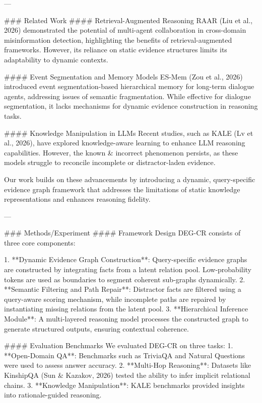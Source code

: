 ---

### Related Work
#### Retrieval-Augmented Reasoning
RAAR (Liu et al., 2026) demonstrated the potential of multi-agent collaboration in cross-domain misinformation detection, highlighting the benefits of retrieval-augmented frameworks. However, its reliance on static evidence structures limits its adaptability to dynamic contexts.

#### Event Segmentation and Memory Models
ES-Mem (Zou et al., 2026) introduced event segmentation-based hierarchical memory for long-term dialogue agents, addressing issues of semantic fragmentation. While effective for dialogue segmentation, it lacks mechanisms for dynamic evidence construction in reasoning tasks.

#### Knowledge Manipulation in LLMs
Recent studies, such as KALE (Lv et al., 2026), have explored knowledge-aware learning to enhance LLM reasoning capabilities. However, the known & incorrect phenomenon persists, as these models struggle to reconcile incomplete or distractor-laden evidence.

Our work builds on these advancements by introducing a dynamic, query-specific evidence graph framework that addresses the limitations of static knowledge representations and enhances reasoning fidelity.

---

### Methods/Experiment
#### Framework Design
DEG-CR consists of three core components:

1. **Dynamic Evidence Graph Construction**: Query-specific evidence graphs are constructed by integrating facts from a latent relation pool. Low-probability tokens are used as boundaries to segment coherent sub-graphs dynamically.
2. **Semantic Filtering and Path Repair**: Distractor facts are filtered using a query-aware scoring mechanism, while incomplete paths are repaired by instantiating missing relations from the latent pool.
3. **Hierarchical Inference Module**: A multi-layered reasoning model processes the constructed graph to generate structured outputs, ensuring contextual coherence.

#### Evaluation Benchmarks
We evaluated DEG-CR on three tasks:
1. **Open-Domain QA**: Benchmarks such as TriviaQA and Natural Questions were used to assess answer accuracy.
2. **Multi-Hop Reasoning**: Datasets like KinshipQA (Sun & Kazakov, 2026) tested the ability to infer implicit relational chains.
3. **Knowledge Manipulation**: KALE benchmarks provided insights into rationale-guided reasoning.

